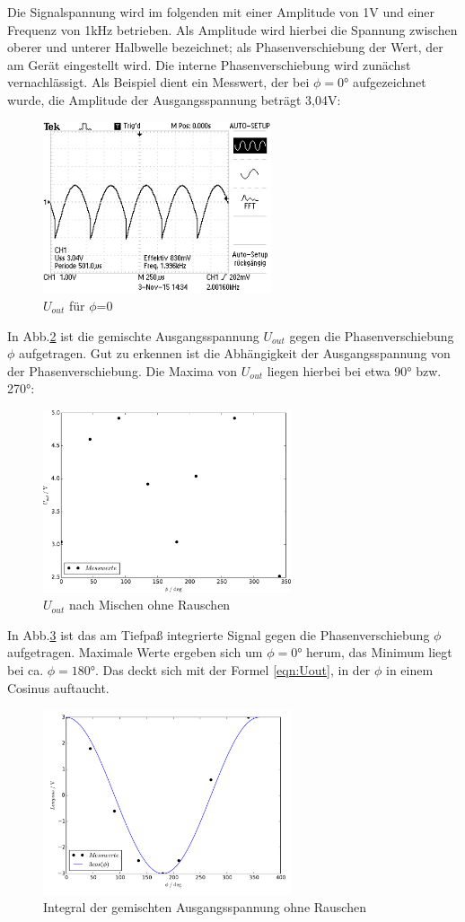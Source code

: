 Die Signalspannung wird im folgenden mit einer Amplitude von 1V und einer
Frequenz von 1kHz betrieben. Als Amplitude wird hierbei die Spannung zwischen
oberer und unterer Halbwelle bezeichnet; als Phasenverschiebung der Wert, der am
Gerät eingestellt wird. Die interne Phasenverschiebung wird zunächst
vernachlässigt. Als Beispiel dient ein Messwert, der bei $\phi = 0°$
aufgezeichnet wurde, die Amplitude der Ausgangsspannung beträgt 3,04V:
\begin{figure}[H]
  \centering
  \includegraphics[angle=90,height=0.3\textwidth,width=0.6\textwidth]
  {graphics/ALL0031/F0031TEK.jpg}
  \caption{$U_{out}$ für $\phi$=0}
  \label{fig:2/phi0}
\end{figure}

In Abb.\ref{fig:plot2u} ist die gemischte Ausgangsspannung $U_{out}$ gegen die
Phasenverschiebung $\phi$ aufgetragen. Gut zu erkennen ist die Abhängigkeit
der Ausgangsspannung von der Phasenverschiebung. Die Maxima von $U_{out}$
liegen hierbei bei etwa 90° bzw. 270°:
\begin{figure}[H]
  \centering
  \includegraphics[width=0.65\textwidth, height=0.35\textwidth]{plot2u.pdf}
  \caption{$U_{out}$ nach Mischen ohne Rauschen}
  \label{fig:plot2u}
\end{figure}
\newpage
In Abb.\ref{fig:plot2low} ist das am Tiefpaß integrierte Signal gegen die
Phasenverschiebung $\phi$ aufgetragen. Maximale Werte ergeben sich um $\phi = 0°$
herum, das Minimum liegt bei ca. $\phi = 180°$. Das deckt sich mit der Formel
\eqref{eqn:Uout}, in der $\phi$ in einem Cosinus auftaucht.
\begin{figure}[H]
  \centering
  \includegraphics[height=0.35\textwidth,width=0.65\textwidth]{plot2low.pdf}
  \caption{Integral der gemischten Ausgangsspannung ohne Rauschen}
  \label{fig:plot2low}
\end{figure}


